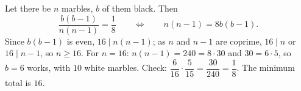 Let there be $n$ marbles, $b$ of them black. Then
\[
\dfrac{b(b-1)}{n(n-1)}=\dfrac{1}{8}\qquad\Longleftrightarrow\qquad n(n-1)=8b(b-1).
\]
Since $b(b-1)$ is even, $16\mid n(n-1)$; as $n$ and $n-1$ are coprime, $16\mid n$ or $16\mid n-1$, so $n\ge16$. For $n=16$: $n(n-1)=240=8\cdot30$ and $30=6\cdot5$, so $b=6$ works, with $10$ white marbles. Check: $\dfrac{6}{16}\cdot\dfrac{5}{15}=\dfrac{30}{240}=\dfrac{1}{8}$. The minimum total is $\boxed{16}$.

